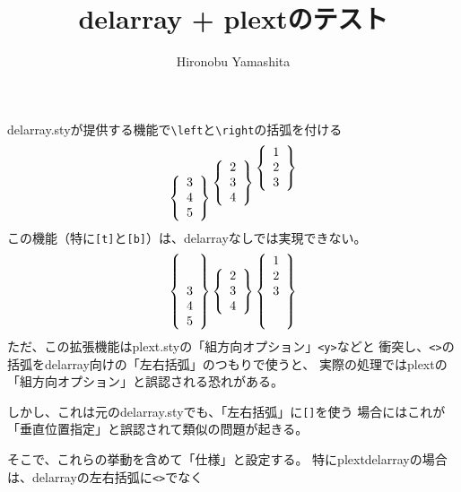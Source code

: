 \documentclass{jsarticle}
\title{delarray + plextのテスト}
\author{Hironobu Yamashita}
\begin{document}
\maketitle
delarray.styが提供する機能で\verb+\left+と\verb+\right+の括弧を付ける
\[
  \begin{array}[t]\{{c}\}
    3 \\ 4 \\ 5
  \end{array}
  \begin{array}[c]\{{c}\}
    2 \\ 3 \\ 4
  \end{array}
  \begin{array}[b]\{{c}\}
    1 \\ 2 \\ 3
  \end{array}
\]
この機能（特に\verb+[t]+と\verb+[b]+）は、delarrayなしでは実現できない。
\[
\left\{
  \begin{array}[t]{c}
    3 \\ 4 \\ 5
  \end{array}
\right\}
\left\{
  \begin{array}[c]{c}
    2 \\ 3 \\ 4
  \end{array}
\right\}
\left\{
  \begin{array}[b]{c}
    1 \\ 2 \\ 3
  \end{array}
\right\}
\]
ただ、この拡張機能はplext.styの「組方向オプション」\verb+<y>+などと
衝突し、\verb+<>+の括弧をdelarray向けの「左右括弧」のつもりで使うと、
実際の処理ではplextの「組方向オプション」と誤認される恐れがある。
\iffalse
\[
  \begin{array}<{cc}>
    a_{11} & a_{12} \\
    a_{21} & a_{22}
  \end{array}
\]
\fi
しかし、これは元のdelarray.styでも、「左右括弧」に\verb+[]+を使う
場合にはこれが「垂直位置指定」と誤認されて類似の問題が起きる。
\iffalse
\[
  \begin{array}[{cc}]
    a_{11} & a_{12} \\
    a_{21} & a_{22}
  \end{array}
\]
\fi
そこで、これらの挙動を含めて「仕様」と設定する。
特にplextdelarrayの場合は、delarrayの左右括弧に\verb+<>+でなく
\end{document}
